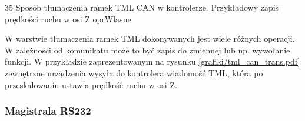 	{35}
	{Sposób tłumaczenia ramek TML CAN w kontrolerze. Przykładowy zapis prędkości ruchu w osi Z}
	{oprWlasne}
	
W warstwie tłumaczenia ramek TML dokonywanych jest wiele różnych operacji. W zależności od komunikatu może to być zapis do zmiennej lub np. wywołanie funkcji. W przykładzie zaprezentowanym na rysunku \ref{grafiki/tml_can_trans.pdf} zewnętrzne urządzenia wysyła do kontrolera wiadomość TML, która po przeskalowaniu ustawia prędkość ruchu w osi Z.

\subsubsection{Magistrala RS232}
	


\clearpage









